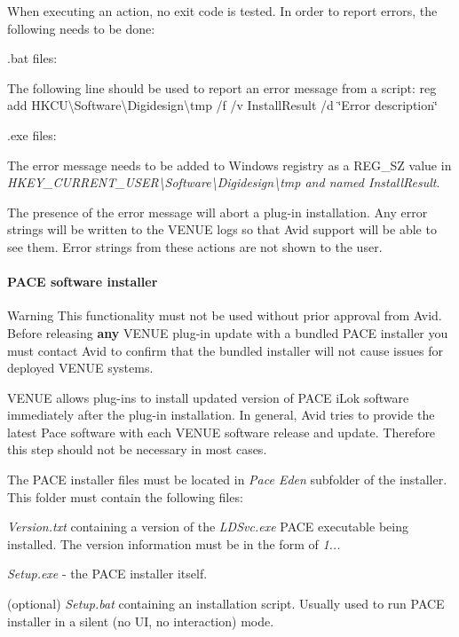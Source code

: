  When executing an action, no exit code is tested. In order to report errors, the following needs to be done\+: 
\begin{DoxyEnumerate}
\item .bat files\+:

The following line should be used to report an error message from a script\+: {\ttfamily reg add H\+K\+C\+U\textbackslash{}Software\textbackslash{}Digidesign\textbackslash{}tmp /f /v Install\+Result /d \char`\"{}\+Error description\char`\"{}}  
\item .exe files\+:

The error message needs to be added to Windows registry as a R\+E\+G\+\_\+\+S\+Z value in {\itshape H\+K\+E\+Y\+\_\+\+C\+U\+R\+R\+E\+N\+T\+\_\+\+U\+S\+E\+R\textbackslash{}Software\textbackslash{}Digidesign\textbackslash{}tmp and named Install\+Result}.  
\end{DoxyEnumerate}

 The presence of the error message will abort a plug-\/in installation. Any error strings will be written to the V\+E\+N\+U\+E logs so that Avid support will be able to see them. Error strings from these actions are not shown to the user.

\hypertarget{a00377_subsubsection__aax_venue_guide__installer__optional_files__pace}{}\paragraph{P\+A\+C\+E software installer}\label{a00377_subsubsection__aax_venue_guide__installer__optional_files__pace}
 \begin{DoxyWarning}{Warning}
This functionality must not be used without prior approval from Avid. Before releasing {\bfseries any} V\+E\+N\+U\+E plug-\/in update with a bundled P\+A\+C\+E installer you must contact Avid to confirm that the bundled installer will not cause issues for deployed V\+E\+N\+U\+E systems.
\end{DoxyWarning}
V\+E\+N\+U\+E allows plug-\/ins to install updated version of P\+A\+C\+E i\+Lok software immediately after the plug-\/in installation. In general, Avid tries to provide the latest Pace software with each V\+E\+N\+U\+E software release and update. Therefore this step should not be necessary in most cases.

 The P\+A\+C\+E installer files must be located in {\itshape Pace Eden} subfolder of the installer. This folder must contain the following files\+: 
\begin{DoxyItemize}
\item {\itshape Version.\+txt} containing a version of the {\itshape L\+D\+Svc.\+exe} P\+A\+C\+E executable being installed. The version information must be in the form of {\itshape 1...}  
\item {\itshape Setup.\+exe} -\/ the P\+A\+C\+E installer itself.  
\item (optional) {\itshape Setup.\+bat} containing an installation script. Usually used to run P\+A\+C\+E installer in a silent (no U\+I, no interaction) mode.  
\end{DoxyItemize}

